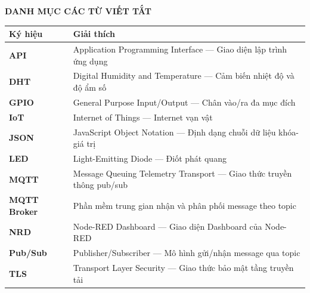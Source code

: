 \documentclass[12pt, a4paper]{article}
\begin{document}
\newpage

\thispagestyle{empty}
\vspace*{0.4cm}
\begin{center}
  \fontsize{17}{21}\selectfont\bfseries DANH MỤC CÁC TỪ VIẾT TẮT
\end{center}
\vspace{0.5cm}

\noindent
\begingroup
\renewcommand{\arraystretch}{1.2}%
\begin{tabularx}{\textwidth}{@{}C{2.5cm}X@{}}
  \toprule
  \textbf{Ký hiệu} & \textbf{Giải thích} \\
  \midrule
  \textbf{API}   & Application Programming Interface --- Giao diện lập trình ứng dụng \\
  \textbf{DHT}    & Digital Humidity and Temperature --- Cảm biến nhiệt độ và độ ẩm số \\
  \textbf{GPIO}   & General Purpose Input/Output --- Chân vào/ra đa mục đích \\
  \textbf{IoT}    & Internet of Things --- Internet vạn vật \\
  \textbf{JSON}   & JavaScript Object Notation --- Định dạng chuỗi dữ liệu khóa-giá trị \\
  \textbf{LED}    & Light-Emitting Diode --- Điốt phát quang \\
  \textbf{MQTT}   & Message Queuing Telemetry Transport --- Giao thức truyền thông pub/sub \\
  \textbf{MQTT Broker} & Phần mềm trung gian nhận và phân phối message theo topic \\
  \textbf{NRD}    & Node-RED Dashboard --- Giao diện Dashboard của Node-RED \\
  \textbf{Pub/Sub} & Publisher/Subscriber --- Mô hình gửi/nhận message qua topic \\
  \textbf{TLS}    & Transport Layer Security --- Giao thức bảo mật tầng truyền tải \\
  \bottomrule
\end{tabularx}
\endgroup

\newpage

\thispagestyle{empty}
\vspace*{0.35\baselineskip}
{\normalsize
  \tableofcontents
}
\newpage
\end{document}
